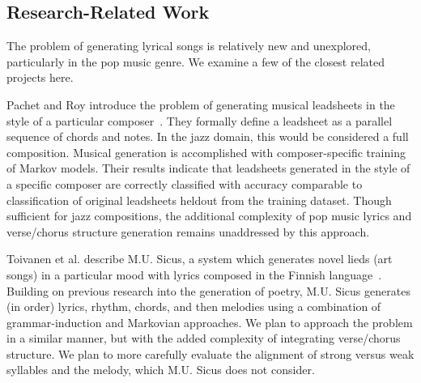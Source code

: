 \documentclass[11pt,phd]{byuprop}
\begin{document}

\subsection{Research-Related Work}


The problem of generating lyrical songs is relatively new and unexplored, particularly in the pop music genre. We examine a few of the closest related projects here.

Pachet and Roy introduce the problem of generating musical leadsheets in the style of a particular composer~\cite{pachet2014imitative}. They formally define a leadsheet as a parallel sequence of chords and notes. In the jazz domain, this would be considered a full composition. Musical generation is accomplished with composer-specific training of Markov models. Their results indicate that leadsheets generated in the style of a specific composer are correctly classified with accuracy comparable to classification of original leadsheets heldout from the training dataset. Though sufficient for jazz compositions, the additional complexity of pop music lyrics and verse/chorus structure generation remains unaddressed by this approach. 

Toivanen et al. describe M.U. Sicus, a system which generates novel lieds (art songs) in a particular mood with lyrics composed in the Finnish language~\cite{toivanen2013automatical}. Building on previous research into the generation of poetry, M.U. Sicus generates (in order) lyrics, rhythm, chords, and then melodies using a combination of grammar-induction and Markovian approaches. We plan to approach the problem in a similar manner, but with the added complexity of integrating verse/chorus structure. We plan to more carefully evaluate the alignment of strong versus weak syllables and the melody, which M.U. Sicus does not consider.
\end{document}
